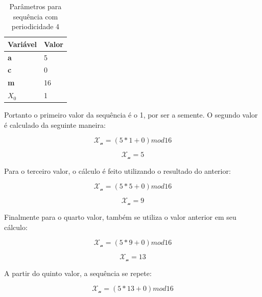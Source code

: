 \begin{table}[h]
	\centering
	\begin{tabular}{|l|l|}	
	\hline
		Variável & Valor \\ \hline
		\textbf{a} & 5 \\ \hline
		\textbf{c} & 0 \\ \hline
		\textbf{m} & 16 \\ \hline
		\textbf{$X_0$} & 1 \\ \hline
	\end{tabular}
	\caption{Parâmetros para sequência com periodicidade 4}
\end{table}

Portanto o primeiro valor da sequência é o 1, por ser a semente. O segundo valor é calculado da seguinte maneira: 

\begin{equation}
	\label{Cálculo do segundo valor}
	\mathcal{X_n} = ( 5 * 1 + 0) mod 16
\end{equation}

\begin{equation}
	\label{Resultado do segundo valor}
	\mathcal{X_n} = 5
\end{equation}

Para o terceiro valor, o cálculo é feito utilizando o resultado do anterior:

\begin{equation}
	\label{Cálculo do terceiro valor}
	\mathcal{X_n} = ( 5 * 5 + 0) mod 16
\end{equation}

\begin{equation}
	\label{Resultado do terceiro valor}
	\mathcal{X_n} = 9
\end{equation}

Finalmente para o quarto valor, também se utiliza o valor anterior em seu cálculo:

\begin{equation}
	\label{Cálculo do quarto valor}
	\mathcal{X_n} = ( 5 * 9 + 0) mod 16
\end{equation}

\begin{equation}
	\label{Resultado do quarto valor}
	\mathcal{X_n} = 13
\end{equation}

A partir do quinto valor, a sequência se repete:

\begin{equation}
	\label{Cálculo do quinto valor}
	\mathcal{X_n} = ( 5 * 13 + 0) mod 16
\end{equation}

